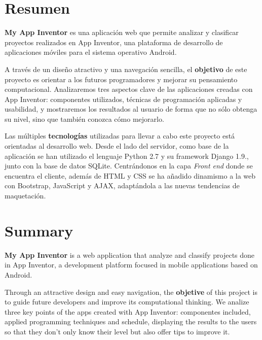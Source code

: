 \documentclass[a4paper, 12pt]{book}
\begin{document}

\chapter*{Resumen}

\textbf{My App Inventor} es una aplicación web que permite analizar y clasificar proyectos realizados en App Inventor, una plataforma de desarrollo de aplicaciones móviles para el sistema operativo Android.

A través de un diseño atractivo y una navegación sencilla, el \textbf{objetivo} de este proyecto es orientar a los futuros programadores y mejorar su pensamiento computacional. Analizaremos tres aspectos clave de las aplicaciones creadas con App Inventor: componentes utilizados, técnicas de programación aplicadas y usabilidad, y mostraremos los resultados al usuario de forma que no sólo obtenga su nivel, sino que también conozca cómo mejorarlo. 
 
Las múltiples \textbf{tecnologías} utilizadas para llevar a cabo este proyecto está orientadas al desarrollo web. Desde el lado del servidor, como base de la aplicación se han utilizado el lenguaje Python 2.7 y su framework Django 1.9., junto con la base de datos SQLite. Centrándonos en la capa \textit{Front end} donde se encuentra el cliente, además de HTML y CSS se ha añadido dinamismo a la web con Bootstrap, JavaScript y AJAX, adaptándola a las nuevas tendencias de maquetación.  



\chapter*{Summary}

\textbf{My App Inventor} is a web application that analyze and classify projects done in App Inventor, a development platform focused in mobile applications based on Android. 

Through an attractive design and easy navigation, the \textbf{objetive} of this project is to guide future developers and improve its computational thinking. We analize three key points of the apps created with App Inventor: componentes included, applied programming techniques and schedule, displaying the results to the users so that they don't only know their level but also offer tips to improve it. 
\end{document}
